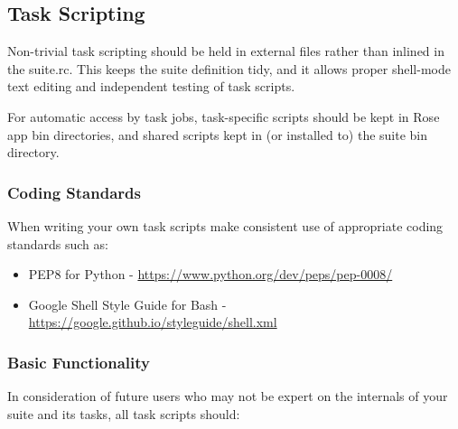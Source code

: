 \subsection{Task Scripting}

Non-trivial task scripting should be held in external files rather than
inlined in the suite.rc. This keeps the suite definition tidy, and it
allows proper shell-mode text editing and independent testing of task scripts.

For automatic access by task jobs, task-specific scripts should be kept in 
Rose app bin directories, and shared scripts kept in (or installed to) the
suite bin directory.

\subsubsection{Coding Standards}

When writing your own task scripts make consistent use of appropriate coding
standards such as:

\begin{itemize}
    \item PEP8 for Python - \url{https://www.python.org/dev/peps/pep-0008/}
    \item Google Shell Style Guide for Bash -
      \url{https://google.github.io/styleguide/shell.xml}
\end{itemize}

\subsubsection{Basic Functionality}

In consideration of future users who may not be expert on the internals of your
suite and its tasks, all task scripts should:



